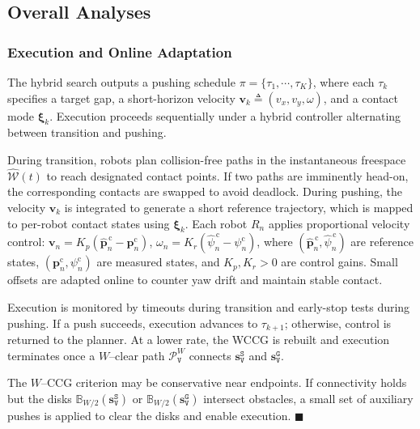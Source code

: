 \subsection{Overall Analyses}\label{subsec:overall}

\subsubsection{Execution and Online Adaptation}\label{subsec:execute}
The hybrid search outputs a pushing schedule
$\pi=\{\tau_1,\cdots,\tau_K\}$, where each $\tau_k$ specifies a target gap, a
short-horizon velocity $\mathbf{v}_k\triangleq(v_x,v_y,\omega)$, and a contact
mode $\boldsymbol{\xi}_k$. Execution proceeds sequentially under a hybrid
controller alternating between transition and pushing.

During transition, robots plan collision-free paths in the instantaneous
freespace $\widehat{\mathcal{W}}(t)$ to reach designated contact points.
If two paths are imminently head-on, the corresponding contacts are swapped to
avoid deadlock. During pushing, the velocity $\mathbf{v}_k$ is integrated to
generate a short reference trajectory, which is mapped to per-robot contact
states using $\boldsymbol{\xi}_k$. Each robot $R_n$ applies proportional
velocity control:
$\mathbf{v}_n = K_{\!p}(\widehat{\mathbf{p}}^{\,\text{c}}_n-\mathbf{p}^{\text{c}}_n)$,
$\omega_n = K_{\!r}(\widehat{\psi}^{\,\text{c}}_n-\psi^{\text{c}}_n)$,
where $(\widehat{\mathbf{p}}^{\,\text{c}}_n,\widehat{\psi}^{\,\text{c}}_n)$ are
reference states, $(\mathbf{p}^{\text{c}}_n,\psi^{\text{c}}_n)$ are measured
states, and $K_{\!p},K_{\!r}>0$ are control gains. Small offsets are adapted
online to counter yaw drift and maintain stable contact.

Execution is monitored by timeouts during transition and early-stop tests during
pushing. If a push succeeds, execution advances to $\tau_{k+1}$; otherwise,
control is returned to the planner. At a lower rate, the WCCG is rebuilt and
execution terminates once a $W$--clear path $\mathcal{P}^W_\texttt{V}$ connects
$\mathbf{s}_\texttt{V}^{\texttt{S}}$ and $\mathbf{s}_\texttt{V}^{\texttt{G}}$.

\begin{remark}
The $W$--CCG criterion may be conservative near endpoints. If connectivity holds
but the disks $\mathbb{B}_{W/2}(\mathbf{s}_\texttt{V}^{\texttt{S}})$ or
$\mathbb{B}_{W/2}(\mathbf{s}_\texttt{V}^{\texttt{G}})$ intersect obstacles, a
small set of auxiliary pushes is applied to clear the disks and enable
execution. \hfill$\blacksquare$
\end{remark}


